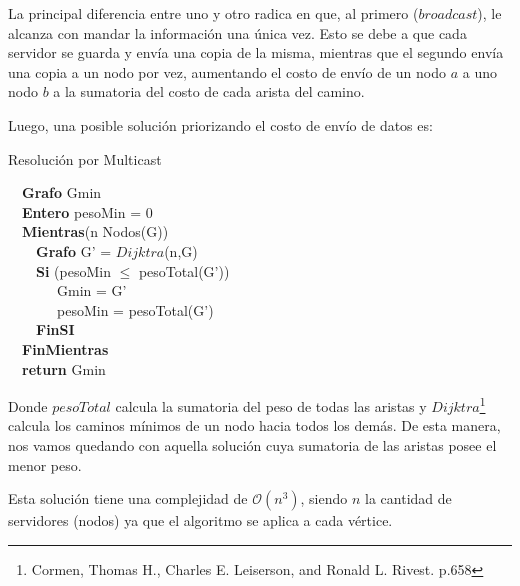  La principal diferencia entre uno y otro radica en que, al primero ($broadcast$), le alcanza con mandar la información una única vez. Esto se debe a que cada servidor se guarda y envía una copia de la misma, mientras que el segundo envía una copia a un nodo por vez, aumentando el costo de envío de un nodo $a$ a uno nodo $b$ a la sumatoria del costo de cada arista del camino. \newline

 Luego, una posible solución priorizando el costo de envío de datos es: \newline

\begin{algorithm}[H]
	\SetAlgoLined
	\caption{Resolución por Multicast}
	\ \ \textbf{Grafo} Gmin \\
	\ \ \textbf{Entero} pesoMin = 0 \\
	\ \ \textbf{Mientras}(n \in Nodos(G)) \\
				\ \ \ \ \textbf{Grafo} G' = $Dijktra$(n,G) \\
				\ \ \ \ \textbf{Si} (pesoMin $\leq$ pesoTotal(G')) \\
	      \ \ \ \ \ \ \ Gmin = G' \\
	      \ \ \ \ \ \ \ pesoMin = pesoTotal(G') \\
				\ \ \ \ \textbf{FinSI} \\
		\ \ \textbf{FinMientras} \\
		\ \ \textbf{return} Gmin 
\end{algorithm}

Donde $pesoTotal$ calcula la sumatoria del peso de todas las aristas y $Dijktra$\footnote{Cormen, Thomas H., Charles E. Leiserson, and Ronald L. Rivest. p.658} calcula los caminos mínimos de un nodo hacia todos los demás. De esta manera, nos vamos quedando con aquella solución cuya sumatoria de las aristas posee el menor peso. \newline

Esta solución tiene una complejidad de $\mathcal{O}(n^{3})$, siendo $n$ la cantidad de servidores (nodos) ya que el algoritmo se aplica a cada vértice.\newline
